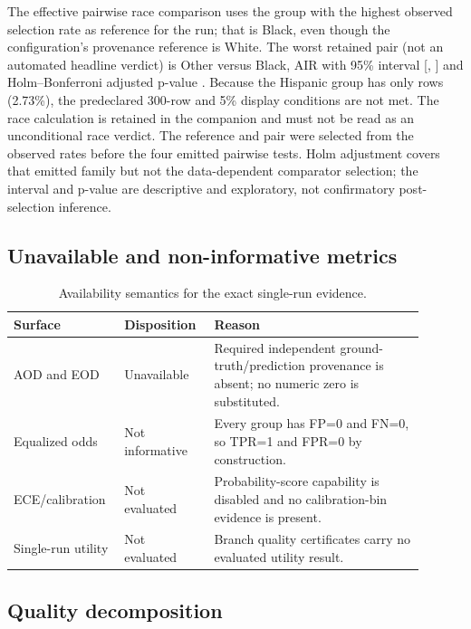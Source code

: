 The effective pairwise race comparison uses the group with the highest observed selection rate as
reference for the run; that is Black, even though the configuration's provenance reference is
White. The worst retained pair (not an automated headline verdict) is Other versus Black, AIR \RaceWorstAIR{} with 95\% interval
[\RaceWorstAIRLCI{}, \RaceWorstAIRUCI{}] and Holm--Bonferroni adjusted p-value
\RaceWorstAIRPValueAdj{}. Because the Hispanic group has only \RaceObservedMinGroupN{} rows
(2.73\%), the predeclared 300-row and 5\% display conditions are not met. The race calculation is
retained in the companion and must not be read as an unconditional race verdict. The reference and
pair were selected from the observed rates before the four emitted pairwise tests. Holm adjustment
covers that emitted family but not the data-dependent comparator selection; the interval and
p-value are descriptive and exploratory, not confirmatory post-selection inference.

\subsection{Unavailable and non-informative metrics}

\begin{table}[H]
\centering
\small
\AccessibleTableHeaderRow
\begin{tabular}{@{}>{\RaggedRight\arraybackslash}p{0.22\linewidth}
                    >{\RaggedRight\arraybackslash}p{0.20\linewidth}
                    >{\RaggedRight\arraybackslash}p{0.48\linewidth}@{}}
\toprule
Surface & Disposition & Reason \\
\midrule
AOD and EOD & Unavailable & Required independent ground-truth/prediction provenance is absent; no numeric zero is substituted. \\
Equalized odds & Not informative & Every group has FP=0 and FN=0, so TPR=1 and FPR=0 by construction. \\
ECE/calibration & Not evaluated & Probability-score capability is disabled and no calibration-bin evidence is present. \\
Single-run utility & Not evaluated & Branch quality certificates carry no evaluated utility result. \\
\bottomrule
\end{tabular}
\caption{Availability semantics for the exact single-run evidence.}
\label{tab:availability}
\end{table}

\subsection{Quality decomposition}

